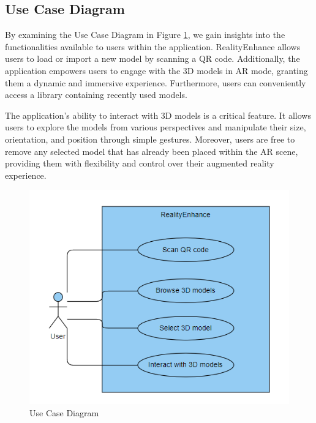 \subsection*{Use Case Diagram}
By examining the Use Case Diagram in Figure \ref{fig:UseCaseDiagram}, we gain insights into the functionalities available to users within the application. RealityEnhance allows users to load or import a new model by scanning a \ac{QR} code. Additionally, the application empowers users to engage with the \ac{3D} models in \ac{AR} mode, granting them a dynamic and immersive experience. Furthermore, users can conveniently access a library containing recently used models.

The application's ability to interact with \ac{3D} models is a critical feature. It allows users to explore the models from various perspectives and manipulate their size, orientation, and position through simple gestures. Moreover, users are free to remove any selected model that has already been placed within the \ac{AR} scene, providing them with flexibility and control over their augmented reality experience.
\begin{figure}[ht]
    \centering
    \includegraphics{img/UseCaseDiagram.png}
    \caption{Use Case Diagram}
    \label{fig:UseCaseDiagram}
\end{figure}

\clearpage

